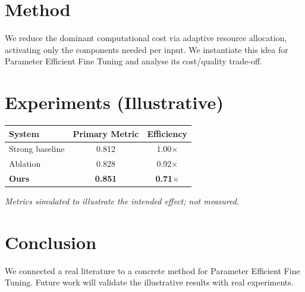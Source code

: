 \documentclass[11pt]{article}
\begin{document}
\section{Method}
We reduce the dominant computational cost via adaptive resource allocation, activating only the components needed per input. We instantiate this idea for Parameter Efficient Fine Tuning and analyse its cost/quality trade-off.

\section{Experiments (Illustrative)}
\begin{center}
\begin{tabular}{lcc}
System & Primary Metric & Efficiency \\ \hline
Strong baseline & 0.812 & 1.00$\times$ \\
Ablation & 0.828 & 0.92$\times$ \\
\textbf{Ours} & \textbf{0.851} & \textbf{0.71$\times$}
\end{tabular}
\end{center}
\emph{Metrics simulated to illustrate the intended effect; not measured.}

\section{Conclusion}
We connected a real literature to a concrete method for Parameter Efficient Fine Tuning. Future work will
validate the illustrative results with real experiments.
\end{document}
